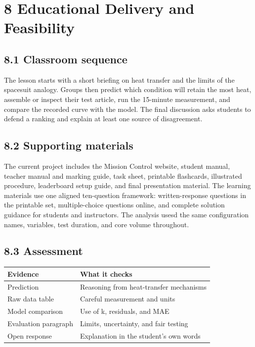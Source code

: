 \documentclass[10pt,conference,a4paper]{IEEEtran}
\begin{document}
\section*{8 Educational Delivery and Feasibility}

\subsection*{8.1 Classroom sequence}

The lesson starts with a short briefing on heat transfer and the limits of the spacesuit analogy. Groups then predict which condition will retain the most heat, assemble or inspect their test article, run the 15-minute measurement, and compare the recorded curve with the model. The final discussion asks students to defend a ranking and explain at least one source of disagreement.

\subsection*{8.2 Supporting materials}

The current project includes the Mission Control website, student manual, teacher manual and marking guide, task sheet, printable flashcards, illustrated procedure, leaderboard setup guide, and final presentation material. The learning materials use one aligned ten-question framework: written-response questions in the printable set, multiple-choice questions online, and complete solution guidance for students and instructors. The analysis usesd the same configuration names, variables, test duration, and core volume throughout.

\subsection*{8.3 Assessment}

\begin{center}\footnotesize
\setlength{\tabcolsep}{2.5pt}
\renewcommand{\arraystretch}{1.14}
\begin{tabular}{>{\raggedright\arraybackslash}p{}>{\raggedright\arraybackslash}p{}}
\toprule
\textbf{Evidence} & \textbf{What it checks} \\
\midrule
Prediction & Reasoning from heat-transfer mechanisms \\
Raw data table & Careful measurement and units \\
Model comparison & Use of k, residuals, and MAE \\
Evaluation paragraph & Limits, uncertainty, and fair testing \\
Open response & Explanation in the student's own words \\
\bottomrule
\end{tabular}
\end{center}
\end{document}
